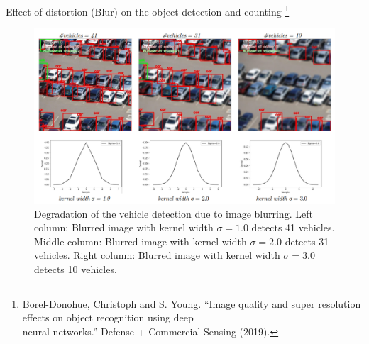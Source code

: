 \documentclass{libs/ufc_format}
\begin{document}
\begin{frame}{\small Effect of distortion (Blur) on the object detection and counting \footnote[frame]{\tiny Borel-Donohue, Christoph and S. Young. “Image quality and super resolution effects on object recognition using deep \\ neural networks.” Defense + Commercial Sensing (2019).}}
    \begin{figure}
        \centering
        \includegraphics[scale=0.2]{libs/blureffect.png}
        \caption{Degradation of the vehicle detection due to image blurring. Left column: Blurred image with kernel width $\sigma=1.0$ detects 41 vehicles. Middle column: Blurred image with kernel width $\sigma=2.0$ detects 31 vehicles. Right column: Blurred image with kernel width $\sigma=3.0$ detects 10 vehicles.}
        \label{fig:challenge}
    \end{figure}

\end{frame}
\end{document}
